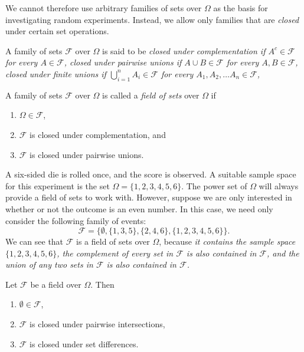 \smallskip
We cannot therefore use arbitrary families of sets over $\Omega$ as the basis for investigating random experiments. Instead, we allow only families that are \emph{closed} under certain set operations.

\begin{definition}
A family of sets $\mathcal{F}$ over $\Omega$ is said to be
\ben
\it \emph{closed under complementation} if $A^c\in\mathcal{F}$ for every $A\in\mathcal{F}$, 
\it \emph{closed under pairwise unions} if $A\cup B\in\mathcal{F}$ for every $A,B\in\mathcal{F}$, 
\it \emph{closed under finite unions}	if $\bigcup_{i=1}^{n} A_i\in\mathcal{F}$ for every $A_1,A_2,\ldots A_n\in\mathcal{F}$,
\een
\end{definition}

\begin{definition}
A family of sets $\mathcal{F}$ over $\Omega$ is called a \emph{field of sets} over $\Omega$ if
\begin{enumerate}
\item $\Omega\in\mathcal{F}$,
\item $\mathcal{F}$ is closed under complementation, and
\item $\mathcal{F}$ is closed under pairwise unions.
\end{enumerate}
\end{definition}

\begin{example}\label{ex:fields_of_sets}
A six-sided die is rolled once, and the score is observed. A suitable sample space for this experiment is the set 
$\Omega=\{1,2,3,4,5,6\}$. The power set of $\Omega$ will always provide a field of sets to work with. However, suppose we are only interested in whether or not the outcome is an even number. In this case, we need only consider the following family of events:
\[
\mathcal{F} = \big\{\emptyset, \{1,3,5\}, \{2,4,6\}, \{1,2,3,4,5,6\}\big\}.
\]
We can see that $\mathcal{F}$ is a field of sets over $\Omega$, because
\ben
\it it contains the sample space $\{1,2,3,4,5,6\}$,
\it the complement of every set in $\mathcal{F}$ is also contained in $\mathcal{F}$, and
\it the union of any two sets in $\mathcal{F}$ is also contained in $\mathcal{F}$.
\een
\end{example}

\begin{theorem}
Let $\mathcal{F}$ be a field over $\Omega$. Then
\begin{enumerate}
\item $\emptyset\in\mathcal{F}$,
\item $\mathcal{F}$ is closed under pairwise intersections,
\item $\mathcal{F}$ is closed under set differences.
\end{enumerate}
\end{theorem}


